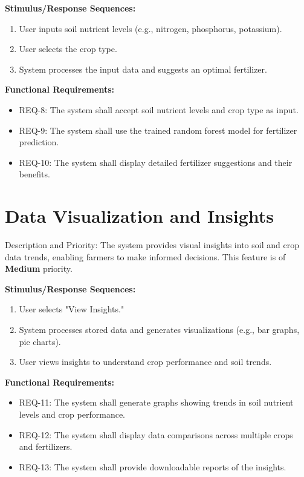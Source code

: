 \documentclass{scrreprt}
\begin{document}
\textbf{Stimulus/Response Sequences:}  
\begin{enumerate}
    \item User inputs soil nutrient levels (e.g., nitrogen, phosphorus, potassium).
    \item User selects the crop type.
    \item System processes the input data and suggests an optimal fertilizer.
\end{enumerate}

\textbf{Functional Requirements:}  
\begin{itemize}
    \item REQ-8: The system shall accept soil nutrient levels and crop type as input.
    \item REQ-9: The system shall use the trained random forest model for fertilizer prediction.
    \item REQ-10: The system shall display detailed fertilizer suggestions and their benefits.
\end{itemize}

\section{Data Visualization and Insights}
Description and Priority:  
The system provides visual insights into soil and crop data trends, enabling farmers to make informed decisions. This feature is of \textbf{Medium} priority.
\newline

 \textbf{Stimulus/Response Sequences: }
\begin{enumerate}
    \item User selects "View Insights."
    \item System processes stored data and generates visualizations (e.g., bar graphs, pie charts).
    \item User views insights to understand crop performance and soil trends.
\end{enumerate}
\newpage
\textbf{Functional Requirements: } 
\begin{itemize}
    \item REQ-11: The system shall generate graphs showing trends in soil nutrient levels and crop performance.
    \item REQ-12: The system shall display data comparisons across multiple crops and fertilizers.
    \item REQ-13: The system shall provide downloadable reports of the insights.
\end{itemize}
\end{document}
